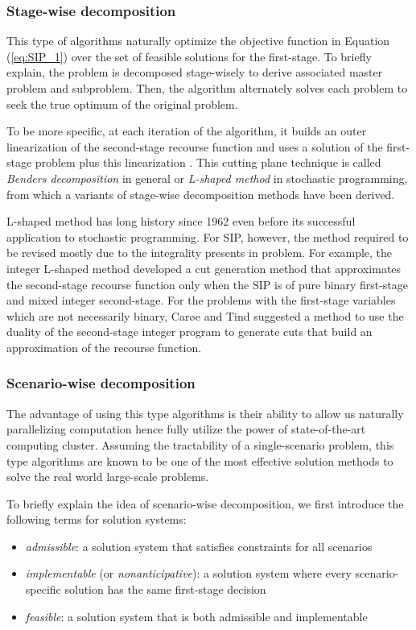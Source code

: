 \subsubsection{Stage-wise decomposition}
This type of algorithms naturally optimize the objective function in Equation (\ref{eq:SIP_1}) over the set of feasible solutions for the first-stage. To briefly explain, the problem is decomposed stage-wisely to derive associated master problem and subproblem. Then, the algorithm alternately solves each problem to seek the true optimum of the original problem.
 
To be more specific, at each iteration of the algorithm, it builds an outer linearization of the second-stage recourse function and uses a solution of the first-stage problem plus this linearization \cite{book:BL2011}. This cutting plane technique is called \textit{Benders decomposition} \cite{journal:B1962} in general or \textit{L-shaped method} in stochastic programming, from which a variants of stage-wise decomposition methods have been derived. 

L-shaped method has long history since 1962 even before its successful application to stochastic programming. For SIP, however, the method required to be revised mostly due to the integrality presents in problem. For example, the integer L-shaped method \cite{journal:LL1993} developed a cut generation method that approximates the second-stage recourse function only when the SIP is of pure binary first-stage and mixed integer second-stage. For the problems with the first-stage variables which are not necessarily binary, Car{\o}e and Tind \cite{journal:CT1998} suggested a method to use the duality of the second-stage integer program to generate cuts that build an approximation of the recourse function.

\subsubsection{Scenario-wise decomposition}
The advantage of using this type algorithms is their ability to allow us naturally parallelizing computation hence fully utilize the power of state-of-the-art computing cluster. Assuming the tractability of a single-scenario problem, this type algorithms are known to be one of the most effective solution methods to solve the real world large-scale problems.

To briefly explain the idea of scenario-wise decomposition, we first introduce the following terms for solution systems:
\begin{itemize}
	\item \textit{admissible}: a solution system that satisfies constraints for all scenarios
	\item \textit{implementable} (or \textit{nonanticipative}): a solution system where every scenario-specific solution has the same first-stage decision
	\item \textit{feasible}: a solution system that is both admissible and implementable
\end{itemize}

